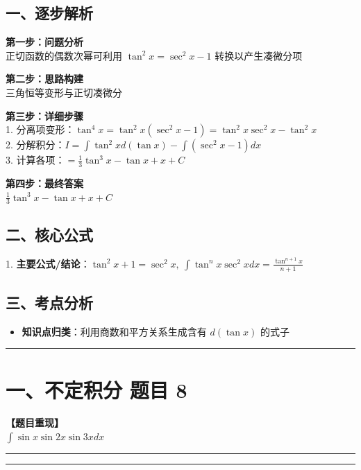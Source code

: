 ﻿\documentclass[12pt, a4paper]{ctexart}
\newcommand{\TopSeparator}{
    \par\noindent\rule{\textwidth}{1.5pt}\vspace{0.5em}
}
\newcommand{\AnalysisSeparator}{
    \par\noindent\rule{\textwidth}{0.5pt}\vspace{0.2em}\hrule\vspace{0.5em}
}
\newenvironment{RedAnalysis}{
    \par
    \color{red} 
}{
    \par
    \color{black} 
}
\begin{document}
\begin{RedAnalysis}

	\subsection*{一、逐步解析}

	\textbf{第一步：问题分析} \\
	正切函数的偶数次幂可利用 $\tan^2 x = \sec^2 x - 1$ 转换以产生凑微分项

	\textbf{第二步：思路构建} \\
	三角恒等变形与正切凑微分

	\textbf{第三步：详细步骤} \\
	1. 分离项变形：$\tan^4 x = \tan^2 x (\sec^2 x - 1) = \tan^2 x \sec^2 x - \tan^2 x$ \\ 
	2. 分解积分：$I = \int \tan^2 x d(\tan x) - \int (\sec^2 x - 1) dx$ \\ 
	3. 计算各项：$ = \frac{1}{3}\tan^3 x - \tan x + x + C$

	\textbf{第四步：最终答案} \\
	$\frac{1}{3}\tan^3 x - \tan x + x + C$

	\subsection*{二、核心公式}
	1. \textbf{主要公式/结论}：$\tan^2 x + 1 = \sec^2 x, \ \int \tan^n x \sec^2 x dx = \frac{\tan^{n+1}x}{n+1}$

	\subsection*{三、考点分析}
	\begin{itemize}
		\item \textbf{知识点归类}：利用商数和平方关系生成含有 $d(\tan x)$ 的式子
	\end{itemize}

\end{RedAnalysis}

\vspace{2em}

\TopSeparator
\section*{一、不定积分 题目 8}

\textbf{【题目重现】} \\
$\int \sin x \sin 2x \sin 3x dx$

\AnalysisSeparator
\end{document}
